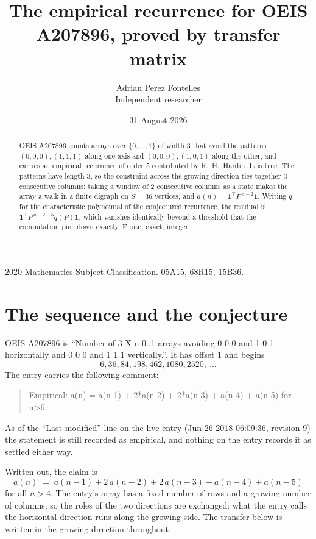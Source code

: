 \documentclass[11pt,a4paper]{article}
\title{The empirical recurrence for OEIS A207896, proved by transfer matrix}
\author{Adrian Perez Fontelles\\ \small Independent researcher}
\date{31 August 2026}
\theoremstyle{plain}
\theoremstyle{definition}
\begin{document}
\maketitle

\begin{abstract}
OEIS A207896 counts arrays over $\{0,\dots,1\}$ of width $3$ that avoid the patterns
$(0,0,0), (1,1,1)$ along one axis and $(0,0,0), (1,0,1)$ along the other, and carries an empirical recurrence of
order $5$ contributed by R.~H.~Hardin. It is true. The patterns have length $3$, so
the constraint across the growing direction ties together $3$ consecutive columns: taking a
window of $2$ consecutive columns as a state makes the array a walk in a finite digraph
on $S=36$ vertices, and $a(n)=\mathbf{1}^{\!\top}P^{\,n-2}\mathbf{1}$. Writing $q$
for the characteristic polynomial of the conjectured recurrence, the residual is
$\mathbf{1}^{\!\top}P^{\,n-2-5}q(P)\mathbf{1}$, which vanishes identically
beyond a threshold that the computation pins down exactly. Finite, exact, integer.
\end{abstract}

\noindent\small 2020 Mathematics Subject Classification. 05A15, 68R15, 15B36.\normalsize

\section{The sequence and the conjecture}

OEIS A207896 is ``Number of 3 X n 0..1 arrays avoiding 0 0 0 and 1 0 1 horizontally and 0 0 0 and 1 1 1 vertically.''. It has offset
$1$ and begins
\[
6, 36, 84, 198, 462, 1080, 2520,\ \dots
\]
The entry carries the following comment:
\begin{quote}\small
Empirical: a(n) = a(n-1) + 2*a(n-2) + 2*a(n-3) + a(n-4) + a(n-5) for n>6.
\end{quote}
As of the ``Last modified'' line on the live entry (Jun 26 2018 06:09:36, revision
9) the statement is still recorded as empirical, and nothing on the entry
records it as settled either way.

Written out, the claim is
\begin{equation}\label{eq:conj}
a(n)\;=\;a(n-1) + 2\,a(n-2) + 2\,a(n-3) + a(n-4) + a(n-5)
\end{equation}
for all $n>4$. The entry's array has a fixed number of rows and a growing number of
columns, so the roles of the two directions are exchanged: what the entry calls the
horizontal direction runs along the growing side. The transfer below is written in the
growing direction throughout.
\end{document}
